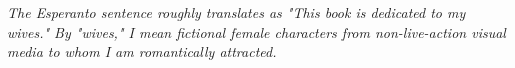 \clearpage

\thispagestyle{empty}
{\centering\itshape\Large%
    {%
        The Esperanto sentence roughly translates as
        "This book is dedicated to my wives."
        By "wives,"
        I mean fictional female characters
        from non-live-action visual media
        to whom I am romantically attracted.%
    }%
    \par}
\clearpage

\thispagestyle{empty}\mbox{}\clearpage
